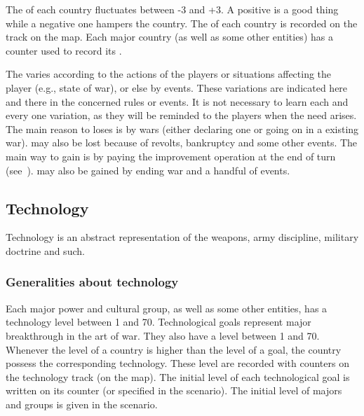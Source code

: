 \aparag The \STAB of each country fluctuates between -3 and +3. A positive
\STAB is a good thing while a negative one hampers the country.
\bparag The \STAB of each country is recorded on the \STAB track on the \ROTW
map.
\bparag Each major country (as well as some other entities) has a \STAB
counter used to record its \STAB.

 The \STAB varies according to the actions
of the players or situations affecting the player (e.g., state of war), or
else by events.
\bparag These variations are indicated here and there in the concerned rules
or events. It is not necessary to learn each and every one variation, as they
will be reminded to the players when the need arises.
\bparag The main reason to loses \STAB is by wars (either declaring one or
going on in a existing war). \STAB may also be lost because of revolts,
bankruptcy and some other events.
\bparag The main way to gain \STAB is by paying the \STAB improvement
operation at the end of turn (see~). \STAB may also be gained by ending war and a handful of
events.

%
%
%
%






\subsection{Technology}\label{chThepowers:Technology}

\aparag Technology is an abstract representation of the weapons, army
discipline, military doctrine and such.


\subsubsection{Generalities about technology}
 Each major power and cultural group, as well as
some other entities, has a technology level between 1 and 70.
\bparag Technological goals represent major breakthrough in the art of
war. They also have a level between 1 and 70.
\bparag Whenever the level of a country is higher than the level of a goal,
the country possess the corresponding technology.
\bparag These level are recorded with counters on the technology track (on the
\ROTW map).
\bparag The initial level of each technological goal is written on its counter
(or specified in the scenario). The initial level of majors and groups is
given in the scenario.

